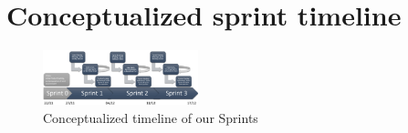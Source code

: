 \section{Conceptualized sprint timeline}
\label{sec:sprint-timeline}

\begin{figure}[htb]
\centering
    \includegraphics[angle=270, width=0.40\textwidth]{Appendices/graphics/sprinttimeline.png}
    \caption{Conceptualized timeline of our Sprints}
    \label{fig:sprintfig}
\end{figure}